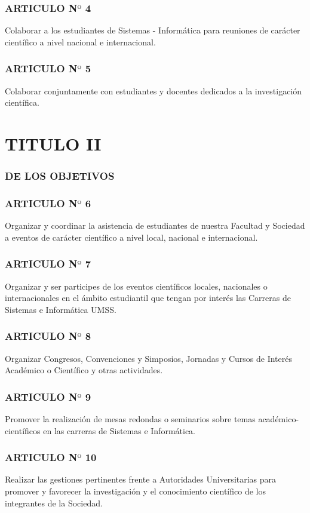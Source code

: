 \documentclass[letterpaper,11pt]{book}
\begin{document}
\subsubsection*{ARTICULO N$º$ 4}
Colaborar a los estudiantes de Sistemas - Informática para reuniones de carácter científico a nivel nacional e internacional.
\subsubsection*{ARTICULO N$º$ 5}
Colaborar  conjuntamente con estudiantes y docentes dedicados a la investigación científica.
\section*{TITULO II}

\subsubsection*{DE LOS OBJETIVOS}

\subsubsection*{ARTICULO N$º$ 6}
Organizar y coordinar la asistencia de estudiantes de nuestra Facultad y Sociedad a eventos de carácter científico a nivel local, nacional e internacional.
\subsubsection*{ARTICULO N$º$ 7}
Organizar y ser participes de los eventos científicos locales, nacionales o internacionales en el ámbito estudiantil que tengan por interés las Carreras de Sistemas e Informática UMSS. 
\subsubsection*{ARTICULO N$º$ 8}
Organizar Congresos, Convenciones y Simposios, Jornadas y Cursos de Interés Académico o Científico y otras actividades.
\subsubsection*{ARTICULO N$º$ 9}
Promover la realización de mesas redondas o seminarios sobre temas académico-científicos en las carreras de Sistemas e Informática.
\subsubsection*{ARTICULO N$º$ 10}
Realizar las gestiones pertinentes frente a Autoridades Universitarias para promover y favorecer la investigación y el conocimiento científico de los integrantes de la Sociedad.
\end{document}
